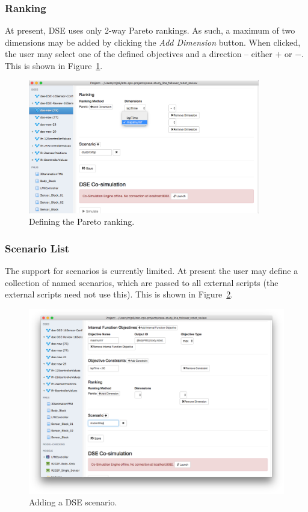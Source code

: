 \subsubsection{Ranking}\label{sec:dse:app:ranking}
At present, DSE uses only 2-way Pareto rankings. As such, a maximum of two dimensions may be added by clicking the \textit{Add Dimension} button. When clicked, the user may select one of the defined objectives and a direction -- either $+$ or $-$. This is shown in Figure~\ref{fig:dse:edit:app-ranking-dimension}.
%
%
%
\begin{figure}[ht]
	\centering
	\includegraphics[width=0.9\textwidth]{figures/dse/app-ranking-dimension}
	\caption{Defining the Pareto ranking.}\label{fig:dse:edit:app-ranking-dimension}
\end{figure}
%
%
%
\subsubsection{Scenario List}\label{sec:dse:app:scenarios}
The support for scenarios is currently limited. At present the user may define a collection of named scenarios, which are passed to all external scripts (the external scripts need not use this). This is shown in Figure~\ref{fig:dse:edit:app-scen}.
%
\begin{figure}[ht]
	\centering
	\includegraphics[width=\textwidth]{figures/dse/app-scen}
	\caption{Adding a DSE scenario.}\label{fig:dse:edit:app-scen}
\end{figure}
%
%
%
